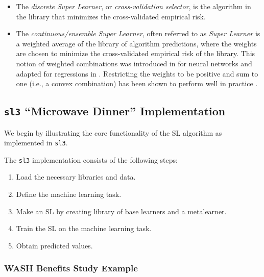 \documentclass[12pt, krantz2,]{krantz}
\providecommand{\tightlist}{%
  \setlength{\itemsep}{0pt}\setlength{\parskip}{0pt}}
\theoremstyle{definition}
\theoremstyle{definition}
\theoremstyle{definition}
\newcommand{\1}{\mathbbm{1}}
\begin{document}
\begin{itemize}
  \begin{itemize}
  \tightlist
  \item
    The \emph{discrete Super Learner}, or \emph{cross-validation selector}, is the
    algorithm in the library that minimizes the cross-validated empirical
    risk.
  \item
    The \emph{continuous/ensemble Super Learner}, often referred to as
    \emph{Super Learner} is a weighted average of the library of algorithm
    predictions, where the weights are chosen to minimize the cross-validated
    empirical risk of the library. This notion of weighted combinations was
    introduced in \citet{wolpert1992stacked} for neural networks and adapted for
    regressions in \citet{breiman1996stacked}. Restricting the weights to be positive
    and sum to one (i.e., a convex combination) has been shown to perform well
    in practice \citep{polley2010super, vdl2007super}.
  \end{itemize}
\end{itemize}

\hypertarget{sl3-microwave-dinner-implementation}{%
\subsection*{\texorpdfstring{\texttt{sl3} ``Microwave Dinner'' Implementation}{sl3 ``Microwave Dinner'' Implementation}}\label{sl3-microwave-dinner-implementation}}


We begin by illustrating the core functionality of the SL algorithm as
implemented in \texttt{sl3}.

The \texttt{sl3} implementation consists of the following steps:

\begin{enumerate}
\def\labelenumi{\arabic{enumi}.}
\setcounter{enumi}{-1}
\tightlist
\item
  Load the necessary libraries and data.
\item
  Define the machine learning task.
\item
  Make an SL by creating library of base learners and a metalearner.
\item
  Train the SL on the machine learning task.
\item
  Obtain predicted values.
\end{enumerate}

\hypertarget{wash-benefits-study-example-1}{%
\subsubsection*{WASH Benefits Study Example}\label{wash-benefits-study-example-1}}
\end{document}

